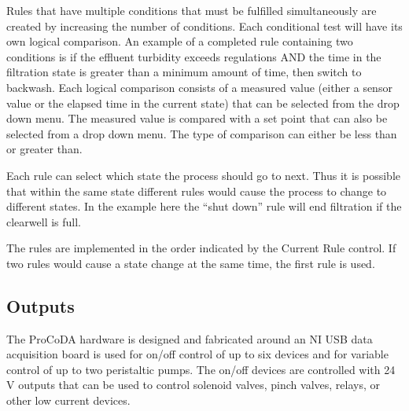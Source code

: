 \documentclass[letterpaper,10pt,english]{sphinxmanual}
\begin{document}
Rules that have multiple conditions that must be fulfilled simultaneously are created by increasing the number of conditions. Each conditional test will have its own logical comparison. An example of a completed rule containing two conditions is if the effluent turbidity exceeds regulations AND the time in the filtration state is greater than a minimum amount of time, then switch to backwash. Each logical comparison consists of a measured value (either a sensor value or the elapsed time in the current state) that can be selected from the drop down menu. The measured value is compared with a set point that can also be selected from a drop down menu. The type of comparison can either be less than or greater than.

Each rule can select which state the process should go to next. Thus it is possible that within the same state different rules would cause the process to change to different states. In the example here the “shut down” rule will end filtration if the clearwell is full.

The rules are implemented in the order indicated by the Current Rule control. If two rules would cause a state change at the same time, the first rule is used.


\subsection{Outputs}
\label{\detokenize{ProCoDA/ProCoDA:outputs}}\label{\detokenize{ProCoDA/ProCoDA:heading-procoda-outputs}}
The ProCoDA hardware is designed and fabricated around an NI USB data acquisition board is used for on/off control of up to six devices and for variable control of up to two peristaltic pumps. The on/off devices are controlled with 24 V outputs that can be used to control solenoid valves, pinch valves, relays, or other low current devices.
\end{document}
